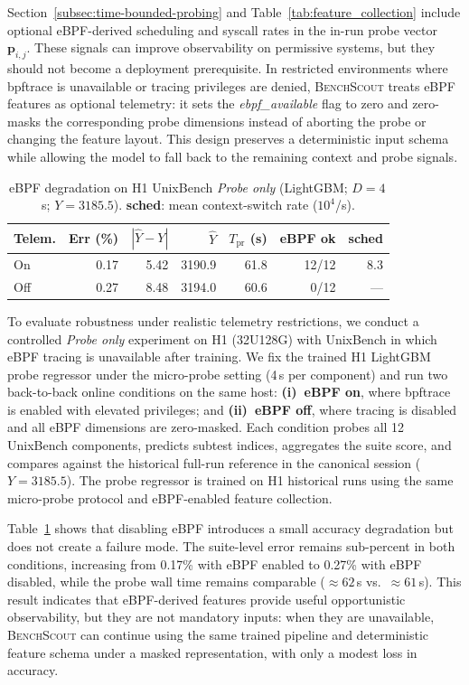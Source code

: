 \documentclass[sigplan,10pt]{acmart}
\newcommand{\ourmethod}{\textsc{BenchScout}\xspace}
\newcommand{\id}[1]{{\itshape #1}}
\begin{document}
Section~\ref{subsec:time-bounded-probing} and Table~\ref{tab:feature_collection} include optional eBPF-derived scheduling and syscall rates in the in-run probe vector~\(\mathbf{p}_{i,j}\).
These signals can improve observability on permissive systems, but they should not become a deployment prerequisite.
In restricted environments where bpftrace is unavailable or tracing privileges are denied, \ourmethod{} treats eBPF features as optional telemetry: it sets the \id{ebpf\_available} flag to zero and zero-masks the corresponding probe dimensions instead of aborting the probe or changing the feature layout.
This design preserves a deterministic input schema while allowing the model to fall back to the remaining context and probe signals.
\begin{table}[t]
\centering
\caption{eBPF degradation on H1 UnixBench \emph{Probe only} (LightGBM; $D{=}4$\,s; $Y{=}3185.5$). \textbf{sched}: mean context-switch rate ($10^4$/s).}
\label{tab:probe-ebpf-ablation}
\small
\begin{tabular*}{\columnwidth}{@{\extracolsep{\fill}}lrrrrrr@{}}
\toprule
\textbf{Telem.} & \textbf{Err (\%)} & $|\hat{Y}{-}Y|$ & $\hat{Y}$ & $T_{\mathrm{pr}}$ (s) & \textbf{eBPF ok} & \textbf{sched} \\
\midrule
On  & 0.17 & 5.42  & 3190.9& 61.8 & 12/12 & 8.3 \\
Off & 0.27 & 8.48&  3194.0 & 60.6 & 0/12 & --- \\
\bottomrule
\end{tabular*}
\end{table}

To evaluate robustness under realistic telemetry restrictions, we conduct a controlled \emph{Probe only} experiment on H1 (32U128G) with UnixBench in which eBPF tracing is unavailable after training. We fix the trained H1 LightGBM probe regressor under the micro-probe setting (4\,s per component) and run two back-to-back online conditions on the same host:
\textbf{(i)~eBPF on}, where bpftrace is enabled with elevated privileges; and
\textbf{(ii)~eBPF off}, where tracing is disabled and all eBPF dimensions are zero-masked.
Each condition probes all 12 UnixBench components, predicts subtest indices, aggregates the suite score, and compares against the historical full-run reference in the canonical session (\(Y=3185.5\)).
The probe regressor is trained on H1 historical runs using the same micro-probe protocol and eBPF-enabled feature collection.

Table~\ref{tab:probe-ebpf-ablation} shows that disabling eBPF introduces a small accuracy degradation but does not create a failure mode.
The suite-level error remains sub-percent in both conditions, increasing from 0.17\% with eBPF enabled to 0.27\% with eBPF disabled, while the probe wall time remains comparable (\(\approx62\)\,s vs.\ \(\approx61\)\,s).
This result indicates that eBPF-derived features provide useful opportunistic observability, but they are not mandatory inputs: when they are unavailable, \ourmethod{} can continue using the same trained pipeline and deterministic feature schema under a masked representation, with only a modest loss in accuracy.
\end{document}
